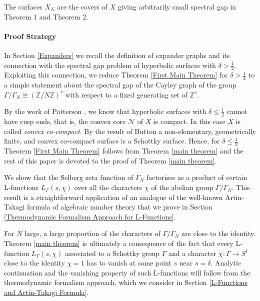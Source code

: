 \documentclass[12pt]{article}
\newcommand{\ZZ}{\mathbb{Z}}
\begin{document}
The surfaces $ X_{N} $ are the covers of $ X $ giving arbitrarily small spectral gap in Theorem 1 and Theorem 2.





\paragraph{Proof Strategy}
In Section \ref{Expanders} we recall the definition of expander graphs and its connection with the spectral gap problem of hyperbolic surfaces with $ \delta > \frac{1}{2} $.  
Exploiting this connection, we reduce Theorem \ref{First Main Theorem} for $ \delta > \frac{1}{2} $ to a simple statement about the spectral gap of the Cayley graph of the group $ \Gamma/\Gamma_{N}\cong (\ZZ/N\ZZ)^{r} $ with respect to a fixed generating set of $ \ZZ^{r} $.

By the work of Patterson \cite{Patt}, we know that hyperbolic surfaces with $ \delta \leq \frac{1}{2} $ cannot have cusp ends, that is, the convex core $ \mathcal{N} $ of $ X $ is compact. In this case $ X $ is called \textit{convex co-compact}. By the result of Button \cite{Button} a non-elementary, geometrically finite, and convex co-compact surface is a Schottky surface. Hence, for $ \delta \leq \frac{1}{2} $ Theorem \ref{First Main Theorem} follows from Theorem \ref{main theorem} and the rest of this paper is devoted to the proof of Theorem \ref{main theorem}.

We show that the Selberg zeta function of $ \Gamma_{N} $ factorizes as a product of certain L-functions $ L_{\Gamma}(s,\chi) $ over all the characters $ \chi $ of the abelian group $ \Gamma/\Gamma_{N} $. This result is a straightforward application of an analogue of the well-known Artin-Takagi formula of algebraic number theory that we prove in Section \ref{Thermodynamic Formalism Approach for L-Functions}.  

For $ N $ large, a large proportion of the characters of $ \Gamma/\Gamma_{N} $ are close to the identity. Theorem \ref{main theorem} is ultimately a consequence of the fact that every L-function $ L_{\Gamma}(s,\chi) $ associated to a Schottky group $ \Gamma $ and a character $ \chi :\Gamma\to S^{1} $ close to the identity $ \chi =1 $ has to vanish at some point $ s $ near $ s=\delta $. Analytic continuation and the vanishing property of such L-functions will follow from the thermodynamic formalism approach, which we consider in Section \ref{L-Functions and Artin-Takagi Formula}.
\end{document}
